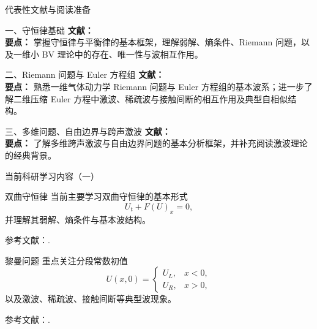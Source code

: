 \documentclass{beamer}
\begin{document}
\begin{frame}{代表性文献与阅读准备}
    \small
    \vspace{-0.4em}

    \begin{block}{一、守恒律基础}
        \textbf{文献：} \cite{Dafermos2016,Bressan2000,Lax1957,Glimm1965} \\
        \textbf{要点：} 掌握守恒律与平衡律的基本框架，理解弱解、熵条件、Riemann 问题，以及一维小 BV 理论中的存在、唯一性与波相互作用。
    \end{block}

    \begin{block}{二、Riemann 问题与 Euler 方程组}
        \textbf{文献：} \cite{ChangHsiao1989,Toro2009,ChangChenYang1995,ChangChenYang2000} \\
        \textbf{要点：} 熟悉一维气体动力学 Riemann 问题与 Euler 方程组的基本波系；进一步了解二维压缩 Euler 方程中激波、稀疏波与接触间断的相互作用及典型自相似结构。
    \end{block}

    \begin{block}{三、多维问题、自由边界与跨声激波}
        \textbf{文献：} \cite{ChenFeldman2003,ChenFeldman2018,Smoller1994} \\
        \textbf{要点：} 了解多维跨声激波与自由边界问题的基本分析框架，并补充阅读激波理论的经典背景。
    \end{block}
\end{frame}


\begin{frame}[t, shrink=5]{当前科研学习内容（一）}
\small

\begin{block}{双曲守恒律}
当前主要学习双曲守恒律的基本形式
\[
U_t+F(U)_x=0,
\]
并理解其弱解、熵条件与基本波结构。

\vspace{0.3em}
{\scriptsize 参考文献：\cite{Dafermos2016,Bressan2000,Lax1957,Glimm1965}.}
\end{block}

\begin{block}{黎曼问题}
重点关注分段常数初值
\[
U(x,0)=
\begin{cases}
U_L, & x<0,\\
U_R, & x>0,
\end{cases}
\]
以及激波、稀疏波、接触间断等典型波现象。

\vspace{0.3em}
{\scriptsize 参考文献：\cite{ChangHsiao1989,Toro2009,ZhangZheng1990}.}
\end{block}

\end{frame}
\end{document}
